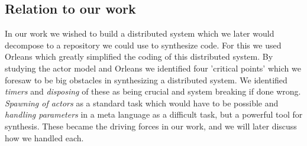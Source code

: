 \subsection{Relation to our work} \label{AMRelation}
In our work we wished to build a distributed system which we later would decompose to a repository we could use to synthesize code. For this we used Orleans which greatly simplified the coding of this distributed system. By studying the actor model and Orleans we identified four 'critical points' which we foresaw to be big obstacles in synthesizing a distributed system. We identified \textit{timers} and \textit{disposing} of these as being crucial and system breaking if done wrong. \textit{Spawning of actors} as a standard task which would have to be possible and \textit{handling parameters} in a meta language as a difficult task, but a powerful tool for synthesis. These became the driving forces in our work, and we will later discuss how we handled each. 